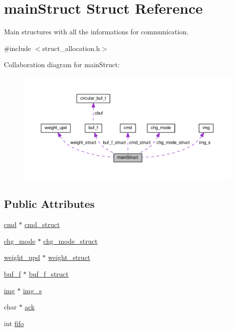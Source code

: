 \hypertarget{structmainStruct}{}\section{main\+Struct Struct Reference}
\label{structmainStruct}


Main structures with all the informations for communication.  




{\ttfamily \#include $<$struct\+\_\+allocation.\+h$>$}



Collaboration diagram for main\+Struct\+:\nopagebreak
\begin{figure}[H]
\begin{center}
\leavevmode
\includegraphics[width=350pt]{structmainStruct__coll__graph}
\end{center}
\end{figure}
\subsection*{Public Attributes}
\begin{DoxyCompactItemize}
\item 
\hyperlink{structcmd}{cmd} $\ast$ \hyperlink{structmainStruct_a17c0f6539b8790947410cfd943bfa000}{cmd\+\_\+struct}
\item 
\hyperlink{structchg__mode}{chg\+\_\+mode} $\ast$ \hyperlink{structmainStruct_a8e3f3e22c2604451e25751ae03f9dcfe}{chg\+\_\+mode\+\_\+struct}
\item 
\hyperlink{structweight__upd}{weight\+\_\+upd} $\ast$ \hyperlink{structmainStruct_a209255d120a094e3a908459f4abd4ab5}{weight\+\_\+struct}
\item 
\hyperlink{structbuf__f}{buf\+\_\+f} $\ast$ \hyperlink{structmainStruct_a4ebcee9ad1aa4da7b1cd4c840becc426}{buf\+\_\+f\+\_\+struct}
\item 
\hyperlink{structimg}{img} $\ast$ \hyperlink{structmainStruct_ad2162b86abcacb3ac540e7e78642f8c3}{img\+\_\+s}
\item 
char $\ast$ \hyperlink{structmainStruct_a9060d9925b2aaf971e3e073c6fbf3d24}{ack}
\item 
int \hyperlink{structmainStruct_a70e7f60d9a8ead3e640d815b10b8ed71}{fifo}
\end{DoxyCompactItemize}



